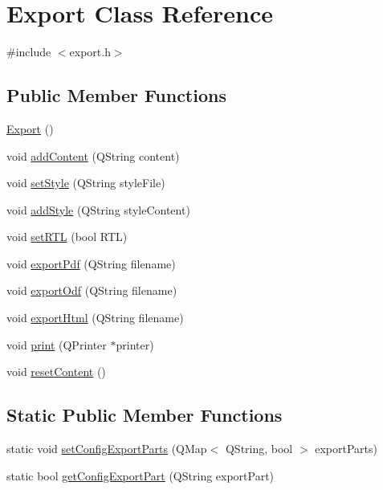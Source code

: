 \hypertarget{class_export}{}\section{Export Class Reference}
\label{class_export}


{\ttfamily \#include $<$export.\+h$>$}

\subsection*{Public Member Functions}
\begin{DoxyCompactItemize}
\item 
\hyperlink{class_export_a2510acbdbeaba62ddfac446b0ec304c9}{Export} ()
\item 
void \hyperlink{class_export_a2cba6d60687929d74366968d56449648}{add\+Content} (Q\+String content)
\item 
void \hyperlink{class_export_a527ef3349dd6d780f61dd90f6abf6a93}{set\+Style} (Q\+String style\+File)
\item 
void \hyperlink{class_export_a4c750f47f0aed231a3f6796c17fe7cf1}{add\+Style} (Q\+String style\+Content)
\item 
void \hyperlink{class_export_a6d52a9d60cf8487327bc8091e281a43a}{set\+R\+TL} (bool R\+TL)
\item 
void \hyperlink{class_export_a8e445716ec53dd24ccb8702f79c28be2}{export\+Pdf} (Q\+String filename)
\item 
void \hyperlink{class_export_a289dc4f2dbbcb8669389f21aa230daeb}{export\+Odf} (Q\+String filename)
\item 
void \hyperlink{class_export_aa41d602fde29fd8a3019136df4f5e862}{export\+Html} (Q\+String filename)
\item 
void \hyperlink{class_export_a833a346f1f72b273fb9e46d602cc458b}{print} (Q\+Printer $\ast$printer)
\item 
void \hyperlink{class_export_a74088c65e5d8c0f887a4a5aaeac078d5}{reset\+Content} ()
\end{DoxyCompactItemize}
\subsection*{Static Public Member Functions}
\begin{DoxyCompactItemize}
\item 
static void \hyperlink{class_export_a443abc5745bec0d20e228c06b6afbcfa}{set\+Config\+Export\+Parts} (Q\+Map$<$ Q\+String, bool $>$ export\+Parts)
\item 
static bool \hyperlink{class_export_ad3babac023d9aa2818df948bf73b3164}{get\+Config\+Export\+Part} (Q\+String export\+Part)
\end{DoxyCompactItemize}


